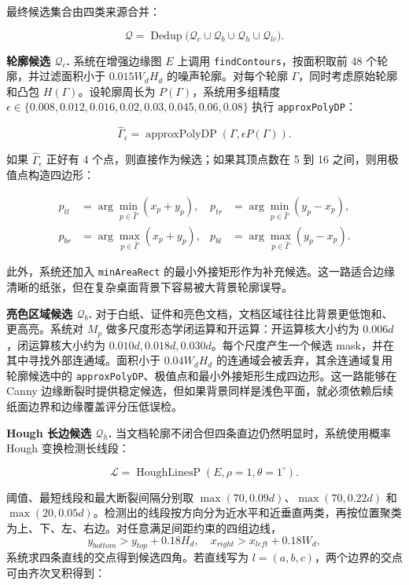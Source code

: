 \documentclass[letterpaper]{article}
\begin{document}
最终候选集合由四类来源合并：

\[
\mathcal{Q}
=
\operatorname{Dedup}\big(
\mathcal{Q}_c\cup\mathcal{Q}_b\cup\mathcal{Q}_h\cup\mathcal{Q}_{lc}
\big).
\]

\textbf{轮廓候选 \(\mathcal{Q}_c\).}
系统在增强边缘图 \(E\) 上调用 \texttt{findContours}，按面积取前 48 个轮廓，并过滤面积小于 \(0.015W_dH_d\) 的噪声轮廓。对每个轮廓 \(\Gamma\)，同时考虑原始轮廓和凸包 \(H(\Gamma)\)。设轮廓周长为 \(P(\Gamma)\)，系统用多组精度
\(\epsilon\in\{0.008,0.012,0.016,0.02,0.03,0.045,0.06,0.08\}\)
执行 \texttt{approxPolyDP}：

\[
\hat{\Gamma}_{\epsilon}=\operatorname{approxPolyDP}(\Gamma,\epsilon P(\Gamma)).
\]

如果 \(\hat{\Gamma}_{\epsilon}\) 正好有 4 个点，则直接作为候选；如果其顶点数在 5 到 16 之间，则用极值点构造四边形：

\[
\begin{aligned}
p_{tl}&=\arg\min_{p\in\hat{\Gamma}}(x_p+y_p),&
p_{tr}&=\arg\min_{p\in\hat{\Gamma}}(y_p-x_p),\\
p_{br}&=\arg\max_{p\in\hat{\Gamma}}(x_p+y_p),&
p_{bl}&=\arg\max_{p\in\hat{\Gamma}}(y_p-x_p).
\end{aligned}
\]

此外，系统还加入 \texttt{minAreaRect} 的最小外接矩形作为补充候选。这一路适合边缘清晰的纸张，但在复杂桌面背景下容易被大背景轮廓误导。

\textbf{亮色区域候选 \(\mathcal{Q}_b\).}
对于白纸、证件和亮色文档，文档区域往往比背景更低饱和、更高亮。系统对 \(M_p\) 做多尺度形态学闭运算和开运算：开运算核大小约为 \(0.006d\)，闭运算核大小约为 \(0.010d,0.018d,0.030d\)。每个尺度产生一个候选 mask，并在其中寻找外部连通域。面积小于 \(0.04W_dH_d\) 的连通域会被丢弃，其余连通域复用轮廓候选中的 \texttt{approxPolyDP}、极值点和最小外接矩形生成四边形。这一路能够在 Canny 边缘断裂时提供稳定候选，但如果背景同样是浅色平面，就必须依赖后续纸面边界和边缘覆盖评分压低误检。

\textbf{Hough 长边候选 \(\mathcal{Q}_h\).}
当文档轮廓不闭合但四条直边仍然明显时，系统使用概率 Hough 变换检测长线段：

\[
\mathcal{L}=\operatorname{HoughLinesP}(E,\rho=1,\theta=1^\circ).
\]

阈值、最短线段和最大断裂间隔分别取
\(\max(70,0.09d)\)、\(\max(70,0.22d)\) 和 \(\max(20,0.05d)\)。检测出的线段按方向分为近水平和近垂直两类，再按位置聚类为上、下、左、右边。对任意满足间距约束的四组边线，
\[
y_{bottom}>y_{top}+0.18H_d,\quad
x_{right}>x_{left}+0.18W_d,
\]
系统求四条直线的交点得到候选四角。若直线写为 \(l=(a,b,c)\)，两个边界的交点可由齐次叉积得到：
\end{document}
